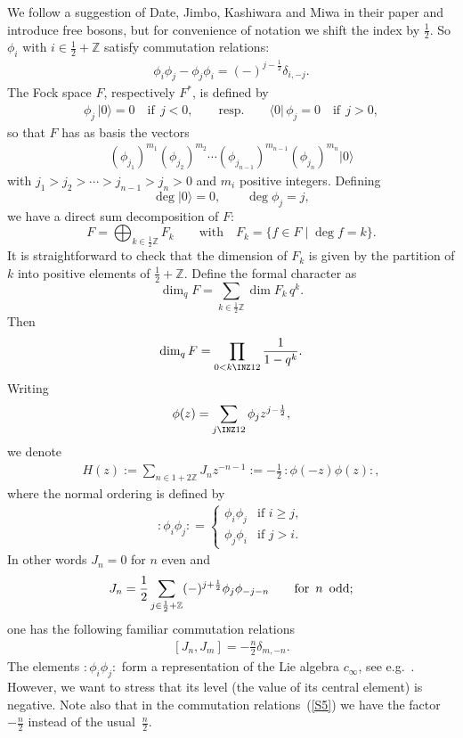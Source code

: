 We follow a suggestion of Date, Jimbo, Kashiwara and Miwa in their paper \cite{DJKMVI}
and introduce free bosons, but for convenience of notation we
shift the index by $\frac 12$. So
$\phi_i$ with $i\in\frac 12+\mathbb{Z}$ satisfy commutation relations:
\begin{gather}
\label{S1}
\phi_{i}\phi_j-\phi_j\phi_i=(-)^{j-\frac{1}{2}}\delta_{i,-j}.
\end{gather}
The Fock space $F$, respectively $F^*$, is def\/ined
by
\begin{gather}
\label{S2} \phi_j\, |0\rangle=0\quad\mbox{if}\ \ j<0,\qquad\mbox{resp.}\qquad
\langle 0|\, \phi_j=0\quad\mbox{if}\ \ j>0,
\end{gather}
so that $F$ has as basis the vectors
 \begin{gather}\label{S2BASIS}
(\phi_{j_1})^{m_1}(\phi_{j_{2}})^{m_{2}}
\cdots(\phi_{j_{n-1}})^{m_{n-1}}(\phi_{j_n})^{m_n}|0\rangle
 \end{gather}
with $j_1>j_2>\cdots> j_{n-1}>j_n>0$ and $m_i$ positive integers.
Def\/ining
\[
\deg |0\rangle =0 ,\qquad\deg\phi_j=j ,
\]
we have a direct sum decomposition of $F$:
\[
F=\bigoplus_{k\in\frac12\mathbb Z} F_k\qquad\mbox{with}\quad
F_k=\{f\in F\mid \deg f=k\} .
\]
It is straightforward to check that the dimension of $F_k$ is
given by the partition of $k$ into
 positive elements of $\frac 12+\mathbb{Z}$.
Def\/ine the formal character as
\[
\dim_q F=\sum_{k\in\frac12\mathbb Z} \dim F_k\, q^k .
\]
Then
\begin{gather}\label{q1}
\dim_q F=\prod_{0<k\INZ12}\frac 1{1-q^k} .
\end{gather}
Writing
\[
\phi(z)=\sum_{j\INZ12}\phi_jz^{j-\frac 12} ,
\]
we denote
\begin{gather}
\label{S4} H(z):=\sum_{n\in
1+2\mathbb{Z}}J_nz^{-n-1}:=-\frac 12\,{:}\phi(-z)\phi(z){:} ,
\end{gather}
where the normal ordering is def\/ined by
\begin{gather}\label{normal ordering}
{:}\phi_i\phi_j{:}=
\begin{cases}
\phi_i\phi_j&\mbox{if }i\ge j ,\\[2pt]
\phi_j\phi_i&\mbox{if }j>i .
\end{cases}
\end{gather}
In other words  $J_n=0$ for $n$ even and
\[ %
J_n=\frac{1}{2}\sum_{j\in
\frac{1}{2}+\mathbb{Z}}(-)^{j+\frac{1}{2}}\phi_j\phi_{-j-n}\qquad
\mbox{for\,\ $n$\,\ odd;}
\] %
one has the following familiar commutation relations
\begin{gather}
\label{S5} [J_n, J_m]=-\frac{n}{2}\delta_{m,-n} .
\end{gather}
The elements ${:}\phi_i\phi_j{:}$ form a representation of the
Lie algebra $c_\infty$, see e.g.~\cite{Kac-Leur}. However,
we want to stress that its level (the value of its central element) is negative.
Note also that in the commutation relations~(\ref{S5}) we
have the factor $-\frac{n}{2}$ instead of the usual~$\frac{n}{2}$.

